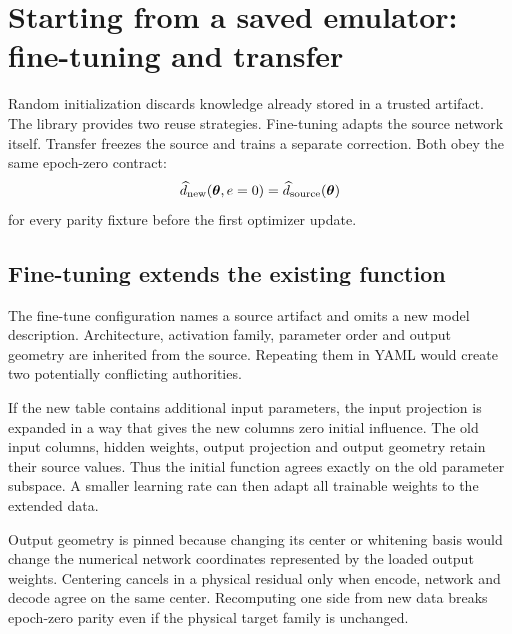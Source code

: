 \documentclass[10pt,aps,prd,twocolumn,nofootinbib]{revtex4-2}
\newcommand{\btheta}{\boldsymbol{\theta}}
\begin{document}
\section{Starting from a saved emulator: fine-tuning and transfer}
\label{sec:warmstart}

Random initialization discards knowledge already stored in a trusted
artifact.  The library provides two reuse strategies.  Fine-tuning adapts the
source network itself.  Transfer freezes the source and trains a separate
correction.  Both obey the same epoch-zero contract:
\begin{equation*}
 \widehat d_{\rm new}(\btheta,e=0)
 =
 \widehat d_{\rm source}(\btheta)
\end{equation*}
for every parity fixture before the first optimizer update.

\subsection{Fine-tuning extends the existing function}

The fine-tune configuration names a source artifact and omits a new model
description.  Architecture, activation family, parameter order and output
geometry are inherited from the source.  Repeating them in YAML would create
two potentially conflicting authorities.

If the new table contains additional input parameters, the input projection
is expanded in a way that gives the new columns zero initial influence.  The
old input columns, hidden weights, output projection and output geometry
retain their source values.  Thus the initial function agrees exactly on the
old parameter subspace.  A smaller learning rate can then adapt all trainable
weights to the extended data.

Output geometry is pinned because changing its center or whitening basis would
change the numerical network coordinates represented by the loaded output
weights.  Centering cancels in a physical residual only when encode, network
and decode agree on the same center.  Recomputing one side from new data breaks
epoch-zero parity even if the physical target family is unchanged.
\end{document}
